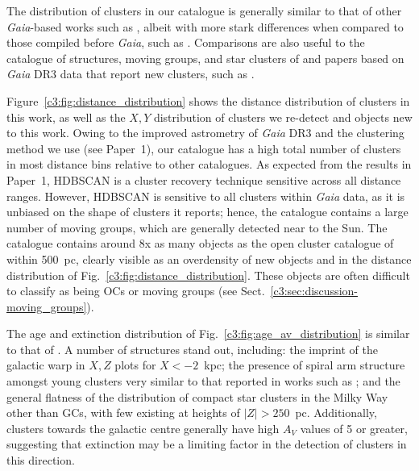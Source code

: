 The distribution of clusters in our catalogue is generally similar to that of other \emph{Gaia}-based works such as \cite{cantat-gaudin_clusters_2020}, albeit with more stark differences when compared to those compiled before \emph{Gaia}, such as \cite{kharchenko_global_2013}. Comparisons are also useful to the catalogue of structures, moving groups, and star clusters of \cite{kounkel_untangling_2020} and papers based on \emph{Gaia} DR3 data that report new clusters, such as \cite{castro-ginard_hunting_2022}.

Figure~\ref{c3:fig:distance_distribution} shows the distance distribution of clusters in this work, as well as the $X,Y$ distribution of clusters we re-detect and objects new to this work. Owing to the improved astrometry of \emph{Gaia} DR3 and the clustering method we use (see Paper~1), our catalogue has a high total number of clusters in most distance bins relative to other catalogues. As expected from the results in Paper~1, HDBSCAN is a cluster recovery technique sensitive across all distance ranges. However, HDBSCAN is sensitive to all clusters within \emph{Gaia} data, as it is unbiased on the shape of clusters it reports; hence, the catalogue contains a large number of moving groups, which are generally detected near to the Sun. The catalogue contains around 8x as many objects as the open cluster catalogue of \cite{cantat-gaudin_clusters_2020} within 500~pc, clearly visible as an overdensity of new objects and in the distance distribution of Fig.~\ref{c3:fig:distance_distribution}. These objects are often difficult to classify as being OCs or moving groups (see Sect.~\ref{c3:sec:discussion-moving_groups}).

The age and extinction distribution of Fig.~\ref{c3:fig:age_av_distribution} is similar to that of \cite{cantat-gaudin_painting_2020}. A number of structures stand out, including: the imprint of the galactic warp in $X,Z$ plots for $X<-2$~kpc; the presence of spiral arm structure amongst young clusters very similar to that reported in works such as \cite{castro-ginard_milky_2021}; and the general flatness of the distribution of compact star clusters in the Milky Way other than GCs, with few existing at heights of $\lvert Z \rvert > 250$~pc. Additionally, clusters towards the galactic centre generally have high $A_V$ values of 5 or greater, suggesting that extinction may be a limiting factor in the detection of clusters in this direction.

